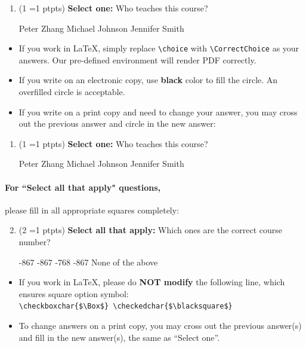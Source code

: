 \documentclass[11pt, letter, answers]{exam}
\newcommand{\pt}[1]{
    \small{(#1 \ifnum#1=1 pt\else pts\fi)}
    \normalsize
}
\newcommand{\sOne}{\textbf{Select one: }}
\newcommand{\sAll}{\textbf{Select all that apply: }}
\newcommand{\blackcircle}{\tikz\draw[black,fill=black] (0,0) circle (1ex);}
\begin{document}
\begin{enumerate}
\item \pt{1} \sOne Who teaches this course?
\begin{checkboxes}
    \CorrectChoice Peter Zhang
    \choice Michael Johnson
    \choice Jennifer Smith
\end{checkboxes}
\end{enumerate}

\begin{itemize}[topsep=0.5em]
\item If you work in \LaTeX{}, simply replace \texttt{\textbackslash choice} with \texttt{\textbackslash CorrectChoice} as your answers. Our pre-defined environment will render PDF correctly.
\item If you write on an electronic copy, use \textbf{black} color to fill the circle. An overfilled circle is acceptable.
\item If you write on a print copy and need to change your answer, you may cross out the previous answer and circle in the new answer:
\end{itemize}

\begin{enumerate}[label={}]
\item \pt{1} \sOne Who teaches this course?
\begin{checkboxes}
    \CorrectChoice Peter Zhang
    \choice Michael Johnson
    \checkboxchar{\xcancel{$\blackcircle$}{}} \choice Jennifer Smith
\end{checkboxes}
\end{enumerate}


\paragraph{For ``Select all that apply" questions,} please fill in all appropriate squares completely:

\begin{enumerate}
\setcounter{enumi}{1}
\item \pt{2} \sAll Which ones are the correct course number?
{
\checkboxchar{$\Box$} \checkedchar{$\blacksquare$}
\begin{checkboxes}
    -867
    -867
    -768
    -867
    \choice None of the above
\end{checkboxes}
}
\end{enumerate}

\begin{itemize}[topsep=0.5em]
\item If you work in \LaTeX, please do \textbf{NOT modify} the following line, which ensures square option symbol:\\
\verb|\checkboxchar{$\Box$} \checkedchar{$\blacksquare$}|
\item To change answers on a print copy, you may cross out the previous answer(s) and fill in the new answer(s), the same as ``Select one''.
\end{itemize}
\end{document}
